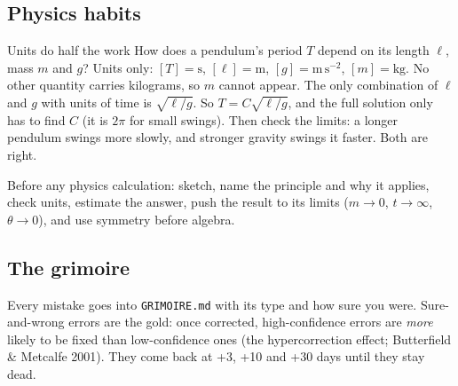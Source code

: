 \documentclass{kaelearn}
\begin{document}
\needspace{65mm}
\begin{center}
\end{center}

\subsection{Physics habits}
\begin{example}{Units do half the work}
How does a pendulum's period $T$ depend on its length $\ell$, mass $m$ and $g$? Units only:
$[T]=\mathrm{s}$, $[\ell]=\mathrm{m}$, $[g]=\mathrm{m\,s^{-2}}$, $[m]=\mathrm{kg}$. No other quantity
carries kilograms, so $m$ cannot appear. The only combination of $\ell$ and $g$ with units of time
is $\sqrt{\ell/g}$. So $T=C\sqrt{\ell/g}$, and the full solution only has to find $C$ (it is $2\pi$
for small swings). Then check the limits: a longer pendulum swings more slowly, and stronger gravity
swings it faster. Both are right.
\end{example}
Before any physics calculation: sketch, name the principle and why it applies, check units, estimate
the answer, push the result to its limits ($m\to0$, $t\to\infty$, $\theta\to0$), and use symmetry
before algebra.

\subsection{The grimoire}
Every mistake goes into \texttt{GRIMOIRE.md} with its type and how sure you were. Sure-and-wrong
errors are the gold: once corrected, high-confidence errors are \emph{more} likely to be fixed than
low-confidence ones (the hypercorrection effect; Butterfield \& Metcalfe 2001). They come back at
+3, +10 and +30 days until they stay dead.
\end{document}
